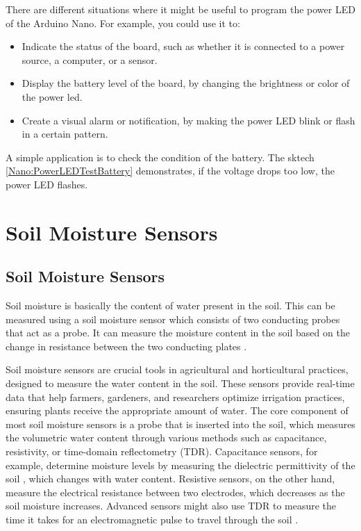 There are different situations where it might be useful to program the power LED of the Arduino Nano. For example, you could use it to:

\begin{itemize}
	\item Indicate the status of the board, such as whether it is connected to a power source, a computer, or a sensor.
	\item  Display the battery level of the board, by changing the brightness or color of the power \ac{led}.
	\item Create a visual alarm or notification, by making the power LED blink or flash in a certain pattern.
\end{itemize}

\bigskip

A simple application is to check the condition of the battery. The sktech \ref{Nano:PowerLEDTestBattery} demonstrates, if the voltage drops too low, the power LED flashes.

{
	\label{Nano:PowerLEDTestBattery}
}

\section{Soil Moisture Sensors}
\subsection{Soil Moisture Sensors}

Soil moisture is basically the content of water present in the soil. This can be measured using a soil moisture sensor which consists of two conducting probes that act as a probe. It can measure the moisture content in the soil based on the change in resistance between the two conducting plates \cite{Aquino:2021}.

Soil moisture sensors are crucial tools in agricultural and horticultural practices, designed to measure the water content in the soil. These sensors provide real-time data that help farmers, gardeners, and researchers optimize irrigation practices, ensuring plants receive the appropriate amount of water. The core component of most soil moisture sensors is a probe that is inserted into the soil, which measures the volumetric water content through various methods such as capacitance, resistivity, or time-domain reflectometry (TDR). Capacitance sensors, for example, determine moisture levels by measuring the dielectric permittivity of the soil \cite{Korlepara:2024}, which changes with water content. Resistive sensors, on the other hand, measure the electrical resistance between two electrodes, which decreases as the soil moisture increases. Advanced sensors might also use TDR to measure the time it takes for an electromagnetic pulse to travel through the soil \cite{Mohammad:2023}.

